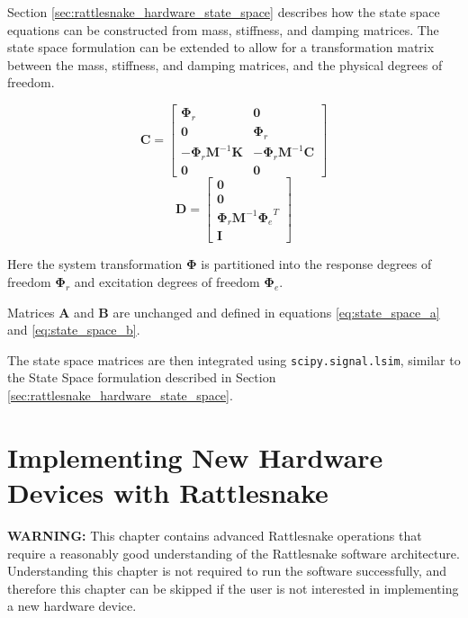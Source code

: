 \documentclass[pdf,12pt,report]{SANDreport}
\newcommand{\inlineCode}{\lstinline[basicstyle=\bfseries\ttfamily]}
\begin{document}
    Section \ref{sec:rattlesnake_hardware_state_space} describes how the state space equations can be constructed from mass, stiffness, and damping matrices.  The state space formulation can be extended to allow for a transformation matrix between the mass, stiffness, and damping matrices, and the physical degrees of freedom.
    
    \begin{equation}\label{eq:state_space_c_w_transform}
        \mathbf{C} = \begin{bmatrix}
            \mathbf{\Phi}_r & \mathbf{0} \\
            \mathbf{0} & \mathbf{\Phi}_r \\
            -\mathbf{\Phi}_r\mathbf{M}^{-1}\mathbf{K} & -\mathbf{\Phi}_r\mathbf{M}^{-1}\mathbf{C} \\
            \mathbf{0} & \mathbf{0}
        \end{bmatrix}
    \end{equation}
    \begin{equation}\label{eq:state_space_d_w_transform}
        \mathbf{D} = \begin{bmatrix}
            \mathbf{0} \\\mathbf{0} \\ \mathbf{\Phi}_r\mathbf{M}^{-1}{\mathbf{\Phi}_e}^T \\ \mathbf{I}
        \end{bmatrix}
    \end{equation}

    Here the system transformation $\mathbf{\Phi}$ is partitioned into the response degrees of freedom $\mathbf{\Phi}_r$ and excitation degrees of freedom $\mathbf{\Phi}_e$.
    
    Matrices $\mathbf{A}$ and $\mathbf{B}$ are unchanged and defined in equations \eqref{eq:state_space_a} and \eqref{eq:state_space_b}.
    
    The state space matrices are then integrated using \inlineCode{scipy.signal.lsim}, similar to the State Space formulation described in Section \ref{sec:rattlesnake_hardware_state_space}.
    
    \chapter{Implementing New Hardware Devices with Rattlesnake}\label{sec:rattlesnake_hardware_implementation}
    \textbf{WARNING:} This chapter contains advanced Rattlesnake operations that require a reasonably good understanding of the Rattlesnake software architecture.  Understanding this chapter is not required to run the software successfully, and therefore this chapter can be skipped if the user is not interested in implementing a new hardware device.
    
\end{document}

